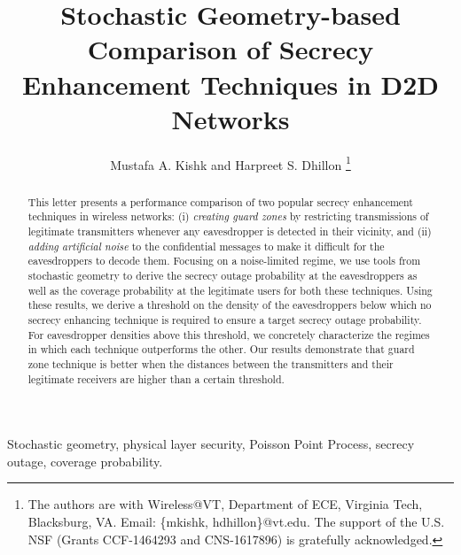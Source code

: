\documentclass[final]{IEEEtran}
\begin{document}
\graphicspath{{./Figures/}}
\title{
Stochastic Geometry-based Comparison of Secrecy Enhancement Techniques in D2D Networks}
\author{
Mustafa A. Kishk and Harpreet S. Dhillon
\thanks{The authors are with Wireless@VT, Department of ECE, Virginia Tech, Blacksburg, VA. Email: \{mkishk, hdhillon\}@vt.edu. The support of the U.S. NSF (Grants CCF-1464293 and CNS-1617896) is gratefully acknowledged.} %
\vspace{-9mm}}



\maketitle

\begin{abstract}
This letter presents a performance comparison of two popular secrecy enhancement techniques in wireless networks: (i) {\em creating guard zones} by restricting transmissions of legitimate transmitters whenever any eavesdropper is detected in their vicinity, and (ii) {\em adding artificial noise} to the confidential messages to make it difficult for the eavesdroppers to decode them. Focusing on a noise-limited regime, we use tools from stochastic geometry to derive the secrecy outage probability at the eavesdroppers as well as the coverage probability at the legitimate users for both these techniques. Using these results, we derive a threshold on the density of the eavesdroppers below which no secrecy enhancing technique is required to ensure a target secrecy outage probability. For eavesdropper densities above this threshold, we concretely characterize the regimes in which each technique outperforms the other. Our results demonstrate that guard zone technique is better when the distances between the transmitters and their legitimate receivers are higher than a certain threshold.%
\end{abstract}
\begin{IEEEkeywords}
Stochastic geometry, physical layer security, Poisson Point Process, secrecy outage, coverage probability.
\end{IEEEkeywords}
\vspace{-4mm}
\end{document}
